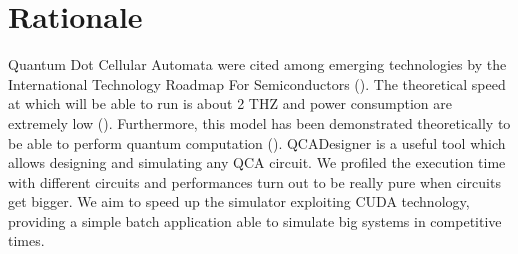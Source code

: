 \chapter{Rationale}\label{sec:rationale}
Quantum Dot Cellular Automata were cited among emerging technologies by the International Technology Roadmap For Semiconductors (\cite{art:ITRS_ERD}). The theoretical speed at which will be able to run is about 2 THZ and power consumption are extremely low (\cite{art:FPGA_Quantum}). Furthermore, this model has been demonstrated theoretically to be able to perform quantum computation (\cite{art:Quantum_QCA}).
QCADesigner is a useful tool which allows designing and simulating any QCA circuit. We profiled the execution time with different circuits and performances turn out to be really pure when circuits get bigger.\newline
We aim to speed up the simulator exploiting CUDA technology, providing a simple batch application able to simulate big systems in competitive times.